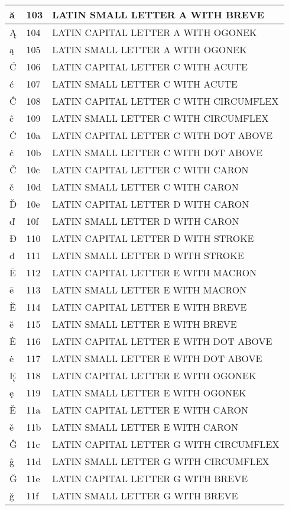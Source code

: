 \documentclass[12pt,letterpaper,openany]{book}
\begin{document}
\begin{center}
\begin{supertabular}{|m{0.25in}|m{0.5in}|m{4in}|}
ă & 103 & LATIN SMALL LETTER A WITH BREVE\\\hline
Ą & 104 & LATIN CAPITAL LETTER A WITH OGONEK\\\hline
ą & 105 & LATIN SMALL LETTER A WITH OGONEK\\\hline
Ć & 106 & LATIN CAPITAL LETTER C WITH ACUTE\\\hline
ć & 107 & LATIN SMALL LETTER C WITH ACUTE\\\hline
Ĉ & 108 & LATIN CAPITAL LETTER C WITH CIRCUMFLEX\\\hline
ĉ & 109 & LATIN SMALL LETTER C WITH CIRCUMFLEX\\\hline
Ċ & 10a & LATIN CAPITAL LETTER C WITH DOT ABOVE\\\hline
ċ & 10b & LATIN SMALL LETTER C WITH DOT ABOVE\\\hline
Č & 10c & LATIN CAPITAL LETTER C WITH CARON\\\hline
č & 10d & LATIN SMALL LETTER C WITH CARON\\\hline
Ď & 10e & LATIN CAPITAL LETTER D WITH CARON\\\hline
ď & 10f & LATIN SMALL LETTER D WITH CARON\\\hline
Đ & 110 & LATIN CAPITAL LETTER D WITH STROKE\\\hline
đ & 111 & LATIN SMALL LETTER D WITH STROKE\\\hline
Ē & 112 & LATIN CAPITAL LETTER E WITH MACRON\\\hline
ē & 113 & LATIN SMALL LETTER E WITH MACRON\\\hline
Ĕ & 114 & LATIN CAPITAL LETTER E WITH BREVE\\\hline
ĕ & 115 & LATIN SMALL LETTER E WITH BREVE\\\hline
Ė & 116 & LATIN CAPITAL LETTER E WITH DOT ABOVE\\\hline
ė & 117 & LATIN SMALL LETTER E WITH DOT ABOVE\\\hline
Ę & 118 & LATIN CAPITAL LETTER E WITH OGONEK\\\hline
ę & 119 & LATIN SMALL LETTER E WITH OGONEK\\\hline
Ě & 11a & LATIN CAPITAL LETTER E WITH CARON\\\hline
ě & 11b & LATIN SMALL LETTER E WITH CARON\\\hline
Ĝ & 11c & LATIN CAPITAL LETTER G WITH CIRCUMFLEX\\\hline
ĝ & 11d & LATIN SMALL LETTER G WITH CIRCUMFLEX\\\hline
Ğ & 11e & LATIN CAPITAL LETTER G WITH BREVE\\\hline
ğ & 11f & LATIN SMALL LETTER G WITH BREVE\\\hline

\end{supertabular}
\end{center}
\end{document}
